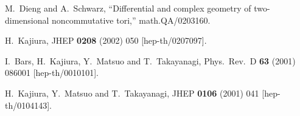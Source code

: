 \documentclass[a4paper,epsf,12pt]{article}
\begin{document}
\begin{thebibliography}{99}
M.~Dieng and A.~Schwarz,
``Differential and complex geometry of two-dimensional noncommutative tori,''
math.QA/0203160.

H.~Kajiura,
JHEP {\bf 0208} (2002) 050
[hep-th/0207097].

I.~Bars, H.~Kajiura, Y.~Matsuo and T.~Takayanagi,
Phys.\ Rev.\ D {\bf 63} (2001) 086001
[hep-th/0010101].

H.~Kajiura, Y.~Matsuo and T.~Takayanagi,
JHEP {\bf 0106} (2001) 041
[hep-th/0104143].

\end{thebibliography}
\end{document}
